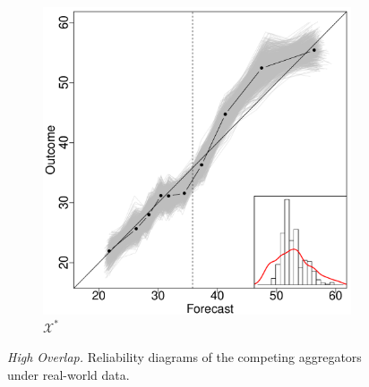 \documentclass[11pt]{article}
\theoremstyle{definition}
\theoremstyle{definition}
\begin{document}
\begin{figure}
\begin{subfigure}[b]{0.323\textwidth}
                \includegraphics[width=\textwidth]{DependentE-OLP}
                \caption{$\mathcal{X}^*$}
                \label{DepEOLPConrete}
        \end{subfigure}
        
          \caption{\textit{High Overlap.}  Reliability diagrams of the competing aggregators  under real-world data.     
%          
          }
               \label{RelDiagramHigh}
\end{figure}
\end{document}
